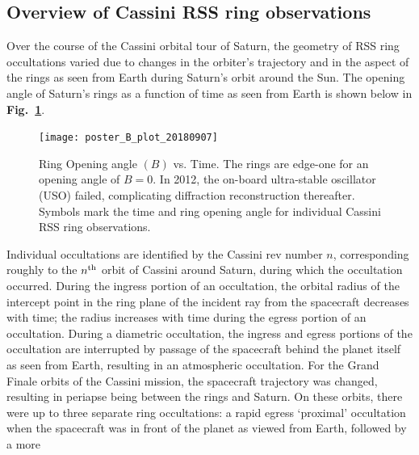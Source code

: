 \documentclass[titlepage, 12pt]{article}
\begin{document}
        \subsection{Overview of Cassini RSS ring observations}
            Over the course of the Cassini orbital tour of Saturn,
            the geometry of RSS ring occultations varied due to
            changes in the orbiter's trajectory and in
            the aspect of the rings as seen from Earth
            during Saturn's orbit around the
            Sun. The opening angle of Saturn's rings
            as a function of time as seen from Earth
            is shown below in \textbf{Fig.~\ref{fig:Bdeg}}.
            \begin{figure}[H]
                \centering
                \texttt{[image: poster\_B\_plot\_20180907]}
                \caption[Ring opening angle vs. year]{%
                    Ring Opening angle $(B)$ vs. Time.
                    The rings are edge-one for an opening angle of
                    $B=0$.
                    In 2012, the on-board ultra-stable oscillator (USO)
                    failed, complicating diffraction reconstruction
                    thereafter. Symbols mark the time and ring opening angle for 
                    individual Cassini RSS ring observations.
                }
                \label{fig:Bdeg}
            \end{figure}
            Individual occultations are identified by the Cassini
            \gls{rev number} $n$, corresponding roughly to the
            $n^{\rm th}$ orbit of Cassini around Saturn, during
            which the occultation occurred. During the
            \gls{ingress} portion of an occultation, the orbital
            radius of the intercept point in the ring plane of
            the incident ray from the spacecraft decreases with
            time; the radius increases with time during the
            \gls{egress} portion of an occultation. During a
            \gls{diametric occultation}, the ingress and egress
            portions of the occultation are interrupted by
            passage of the spacecraft behind the planet itself as
            seen from Earth, resulting in an
            \gls{atmospheric occultation}. For the Grand Finale orbits 
            of the Cassini mission, the spacecraft trajectory was changed, resulting 
            in periapse being between the rings and Saturn. On these orbits, there were up to 
            three separate ring occultations: a rapid egress `proximal' occultation when the
            spacecraft was in front of the planet as viewed from Earth, followed by a more
\end{document}
